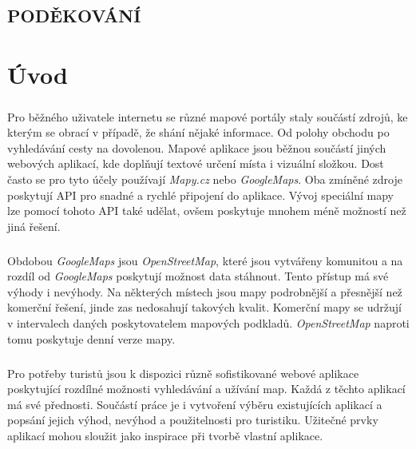 \documentclass[11pt,a4paper,titlepage,oneside]{book}
\begin{document}
\newpage %
	\vspace*{15cm}
	\section*{\Large PODĚKOVÁNÍ}
	\paragraph{}
		
\renewcommand{\baselinestretch}{1.5} %
\newpage %
\pagestyle{plain}
\setcounter{page}{5}

	\tableofcontents

\newpage %
	\listoffigures
	\listoftables


\newpage %
\chapter*{Úvod}
	\paragraph{} Pro běžného uživatele internetu se různé mapové portály staly součástí zdrojů, ke kterým se obrací v případě, že shání nějaké informace. Od polohy obchodu po vyhledávání cesty na dovolenou. Mapové aplikace jsou běžnou součástí jiných webových aplikací, kde doplňují textové určení místa i vizuální složkou. Dost často se pro tyto účely používají \textit{Mapy.cz} nebo \textit{GoogleMaps}. Oba zmíněné zdroje poskytují API pro snadné a rychlé připojení do aplikace. Vývoj speciální mapy lze pomocí tohoto API také udělat, ovšem poskytuje mnohem méně možností než jiná řešení. 
	\paragraph{} Obdobou \textit{GoogleMaps} jsou \textit{OpenStreetMap}, které jsou vytvářeny komunitou a na rozdíl od \textit{GoogleMaps} poskytují možnost data stáhnout. Tento přístup má své výhody i nevýhody. Na některých místech jsou mapy podrobnější a přesnější než komerční řešení, jinde zas nedosahují takových kvalit. Komerční mapy se udržují v intervalech daných poskytovatelem mapových podkladů. \textit{OpenStreetMap} naproti tomu poskytuje denní verze mapy.
	\paragraph{} Pro potřeby turistů jsou k dispozici různě sofistikované webové aplikace poskytující rozdílné možnosti vyhledávání a užívání map. Každá z těchto aplikací má své přednosti. Součástí práce je i vytvoření výběru existujících aplikací a popsání jejich výhod, nevýhod a použitelnosti pro turistiku. Užitečné prvky aplikací mohou sloužit jako inspirace při tvorbě vlastní aplikace. 
\end{document}
